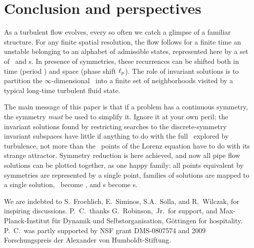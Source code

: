 
\section{Conclusion and perspectives}
\label{s:concl}


As a turbulent flow evolves, every so often we catch a glimpse of a
familiar structure. For any finite spatial resolution, the flow
follows for a finite time an unstable {\cohStr} belonging to an
alphabet of admissible states, represented here by a set of \reqva\
and \rpo s.
In presence of symmetries, these recurrences can be shifted both in time
(period \period{p}) and space (phase shift $\ell_p$).
The role of invariant solutions is
to partition the $\infty$-dimensional \statesp\ into a finite set of
neighborhoods visited by a typical long-time turbulent fluid state.

The main message of this paper is that if a problem has a continuous
symmetry, the symmetry \emph{must} be used to simplify it. Ignore it at
your own peril; the invariant solutions found by restricting
searches to the discrete-symmetry invariant subspaces have little if
anything to do with the full \statesp\ explored by turbulence, not more
than the \eqv\ points of the Lorenz equation have to do with its strange
attractor.
Symmetry reduction
is here achieved, and now all pipe flow solutions can be plotted
together, as one happy family: all points equivalent by symmetries are
represented by a single point, families of solutions are mapped to a
single solution, \reqva\ become \eqva, and \rpo s become \po s.

\begin{acknowledgments}
We are indebted to
S.~Froehlich,
E.~Siminos,
S.A.~Solla,
and
R.~Wilczak,
for inspiring discussions.
P.~C.\ thanks G.~Robinson,~Jr.\ for support, and
Max-Planck-Institut f\"ur Dynamik und Selbstorganisation,
G\"ottingen for hospitality.
P.~C.\ was partly supported by NSF grant DMS-0807574
and
2009 Forschungspreis der Alexander von Humboldt-Stiftung.
\end{acknowledgments}
